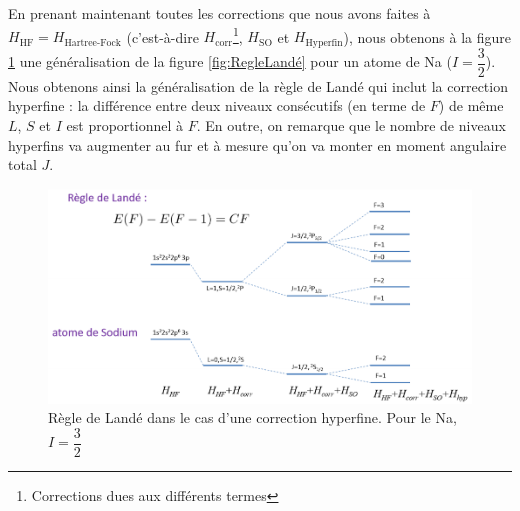 En prenant maintenant toutes les corrections que nous avons faites à $H_\text{HF}=H_\text{Hartree-Fock}$ (c'est-à-dire $H_\text{corr}$\footnote{Corrections dues aux différents termes}, $H_\text{SO}$ et $H_\text{Hyperfin}$), nous obtenons à la figure \ref{fig:regle_lande2} une généralisation de la figure \ref{fig:RegleLandé} pour un atome de Na ($I=\dfrac{3}{2}$). Nous obtenons ainsi la généralisation de la règle de Landé qui inclut la correction hyperfine : la différence entre deux niveaux consécutifs (en terme de $F$) de même $L$, $S$ et $I$ est proportionnel à $F$.
En outre, on remarque que le nombre de niveaux hyperfins va augmenter au fur et à mesure qu'on va monter en moment angulaire total $J$.
\begin{figure}[htp]
    \centering
    \includegraphics[scale=0.8]{Images2/règle_Landé2.png}
    \caption{Règle de Landé dans le cas d'une correction hyperfine. Pour le Na, $I=\dfrac{3}{2}$}
    \label{fig:regle_lande2}
\end{figure}



